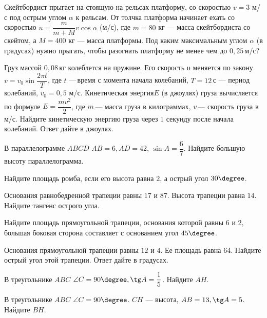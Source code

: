 \begin{class}[number=4]
\begin{listofex}
		\item Скейтбордист прыгает на стоящую на рельсах платформу, со скоростью  \(v = 3\) м/с под острым углом \(\alpha\)  к рельсам. От толчка платформа начинает ехать со скоростью \(u = \dfrac{ m }{ m+M }v \cos \alpha\) (м/с), где \(m = 80\) кг --- масса скейтбордиста со скейтом, а \(M = 400\) кг --- масса платформы. Под каким максимальным углом \(\alpha\) (в градусах) нужно прыгать, чтобы разогнать платформу не менее чем до \(0,25\) м/с?
		\item Груз массой \(0,08\) кг колеблется на пружине. Его скорость υ меняется по закону \( v = v_0 \sin \dfrac{ 2\pi t }{ T } \), где \(t\) --- время с момента начала колебаний, \(T  =  12\) с --- период колебаний, \(v _0=0,5\) м/с. Кинетическая энергия\(E\) (в джоулях) груза вычисляется по формуле \( E = \dfrac{ m v^2 }{ 2 } \),  где \(m\) --- масса груза в килограммах, \(v\) --- скорость груза в м/с. Найдите кинетическую энергию груза через \(1\) секунду после начала колебаний. Ответ дайте в джоулях.
		\item В параллелограмме \(ABCD\) \(AB  = 6, AD  =  42\), \(\sin A= \dfrac{ 6 }{ 7 } \).  Найдите большую высоту параллелограмма.
		\item Найдите площадь ромба, если его высота равна \(2\), а острый угол \(30 \degree \).
		\item Основания равнобедренной трапеции равны \(17\) и \(87\). Высота трапеции равна \(14\). Найдите тангенс острого угла.
		\item Найдите площадь прямоугольной трапеции, основания которой равны \(6\) и \(2\), большая боковая сторона составляет с основанием угол \(45\degree \).
		\item Основания прямоугольной трапеции равны \(12\) и \(4\). Ее площадь равна \(64\). Найдите острый угол этой трапеции. Ответ дайте в градусах.
		\item В треугольнике \(ABC\) \( \angle C = 90 \degree, \tg A = \dfrac{  1}{ 5 } \).  Найдите \(AH\).
		\item В треугольнике \(ABC\) \(\angle C = 90 \degree\). \(CH\) --- высота, \(AB=13, \tg A = 5\). Найдите \(BH\).
	\end{listofex}
\end{class}

